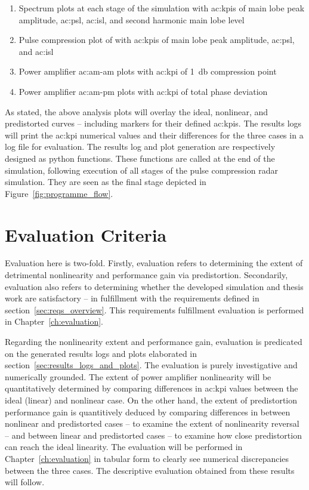 \begin{enumerate}
  \item Spectrum plots at each stage of the simulation with \glspl{ac:kpi} of main lobe peak amplitude, \gls{ac:psl}, \gls{ac:isl}, and second harmonic main lobe level
  \item Pulse compression plot of with \glspl{ac:kpi} of main lobe peak amplitude, \gls{ac:psl}, and \gls{ac:isl}
  \item Power amplifier \gls{ac:am-am} plots with \gls{ac:kpi} of \qty{1}{\decibel} compression point
  \item Power amplifier \gls{ac:am-pm} plots with \gls{ac:kpi} of total phase deviation
\end{enumerate}

As stated, the above analysis plots will overlay the ideal, nonlinear, and predistorted curves -- including markers for their defined \glspl{ac:kpi}. The results logs will print the \gls{ac:kpi} numerical values and their differences for the three cases in a log file for evaluation. The results log and plot generation are respectively designed as python functions. These functions are called at the end of the simulation, following execution of all stages of the pulse compression radar simulation. They are seen as the final stage depicted in Figure~\ref{fig:programme_flow}.

\section{Evaluation Criteria}

Evaluation here is two-fold. Firstly, evaluation refers to determining the extent of detrimental nonlinearity and performance gain via predistortion. Secondarily, evaluation also refers to determining whether the developed simulation and thesis work are satisfactory -- in fulfillment with the requirements defined in section~\ref{sec:reqs_overview}. This requirements fulfillment evaluation is performed in Chapter~\ref{ch:evaluation}. 

Regarding the nonlinearity extent and performance gain, evaluation is predicated on the generated results logs and plots elaborated in section~\ref{sec:results_logs_and_plots}. The evaluation is purely investigative and numerically grounded. The extent of power amplifier nonlinearity will be quantitatively determined by comparing differences in \gls{ac:kpi} values between the ideal (linear) and nonlinear case. On the other hand, the extent of predistortion performance gain is quantitively deduced by comparing differences in between nonlinear and predistorted cases -- to examine the extent of nonlinearity reversal -- and between linear and predistorted cases -- to examine how close predistortion can reach the ideal linearity. The evaluation will be performed in Chapter~\ref{ch:evaluation} in tabular form to clearly see numerical discrepancies between the three cases. The descriptive evaluation obtained from these results will follow. 


